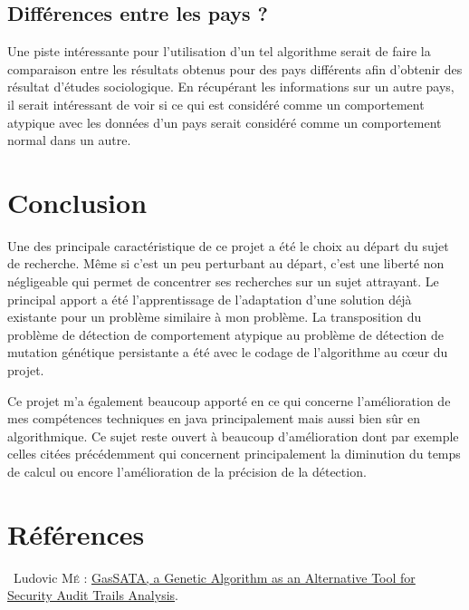 \documentclass[a4paper, 11pt]{article}
\begin{document}
\subsection{Différences entre les pays ?}

Une piste intéressante pour l'utilisation d'un tel algorithme serait de faire la comparaison entre les résultats obtenus pour des pays différents afin d'obtenir des résultat d'études sociologique. En récupérant les informations sur un autre pays, il serait intéressant de voir si ce qui est considéré comme un comportement atypique avec les données d'un pays serait considéré comme un comportement normal dans un autre.

\newpage
\section*{{\LARGE Conclusion}}
\vspace{1cm}


Une des principale caractéristique de ce projet a été le choix au départ du sujet de recherche. Même si c'est un peu perturbant au départ, c'est une liberté non négligeable qui permet de concentrer ses recherches sur un sujet attrayant. Le principal apport a été l'apprentissage de l'adaptation d'une solution déjà existante pour un problème similaire à mon problème. La transposition du problème de détection de comportement atypique au problème de détection de mutation génétique persistante a été avec le codage de l'algorithme au c\oe ur du projet.

Ce projet m'a également beaucoup apporté en ce qui concerne l'amélioration de mes compétences techniques en java principalement mais aussi bien sûr en algorithmique. Ce sujet reste ouvert à beaucoup d'amélioration dont par exemple celles citées précédemment qui concernent principalement la diminution du temps de calcul ou encore l'amélioration de la précision de la détection.


\newpage
\section*{{\LARGE Références}}
\vspace{1cm}


\noindent [1]~Ludovic M\textsc{é} :  \href{http://www.rennes.supelec.fr/ren/perso/lme/PUBLI/raid98.pdf}{GasSATA, a Genetic Algorithm as an Alternative Tool for Security Audit Trails Analysis}. \\
\end{document}
